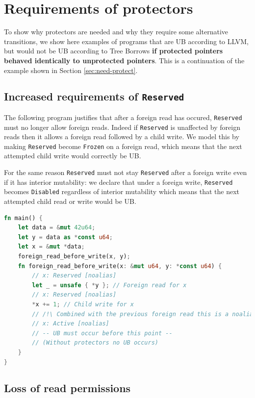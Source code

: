 \documentclass[a4paper,11pt]{article}
\theoremstyle{plain}
\theoremstyle{definition}
\theoremstyle{remark}
\newcommand{\tperm}[1]{\texttt{#1}}
\begin{document}
\newpage
\section{Requirements of protectors}
\label{app:need-protect}

To show why protectors are needed and why they require some alternative
transitions, we show here examples of programs that are UB according to LLVM,
but would not be UB according to Tree Borrows \textbf{if protected pointers behaved identically to unprotected pointers}.
This is a continuation of the example shown in Section \ref{sec:need-protect}.

\subsection{Increased requirements of \tperm{Reserved}}

The following program justifies that after a foreign read has occured, \tperm{Reserved} must no longer allow
foreign reads. Indeed if \tperm{Reserved} is unaffected by foreign reads then it allows a foreign read
followed by a child write. We model this by making \tperm{Reserved} become \tperm{Frozen} on a foreign read,
which means that the next attempted child write would correctly be UB.

For the same reason \tperm{Reserved} must not stay \tperm{Reserved} after a foreign write even
if it has interior mutability: we declare that under a foreign write, \tperm{Reserved} becomes
\tperm{Disabled} regardless of interior mutability which means that the next attempted child read or write would be UB.

\begin{lstlisting}[language=rust]
fn main() {
    let data = &mut 42u64;
    let y = data as *const u64;
    let x = &mut *data;
    foreign_read_before_write(x, y);
    fn foreign_read_before_write(x: &mut u64, y: *const u64) {
        // x: Reserved [noalias]
        let _ = unsafe { *y }; // Foreign read for x
        // x: Reserved [noalias]
        *x += 1; // Child write for x
        // /!\ Combined with the previous foreign read this is a noalias violation
        // x: Active [noalias]
        // -- UB must occur before this point --
        // (Without protectors no UB occurs)
    }
}
\end{lstlisting}


\subsection{Loss of read permissions}
\end{document}
